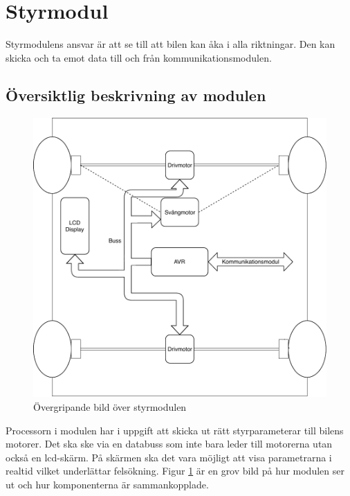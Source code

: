 \documentclass[systemskiss/skiss.tex]{subfiles}
\begin{document}
\section{Styrmodul}
Styrmodulens ansvar är att se till att bilen kan åka i alla riktningar. Den kan skicka och ta emot data till och från kommunikationsmodulen. 
\subsection{Översiktlig beskrivning av modulen}
\begin{figure}[h]
    \centering
    \includegraphics[width=0.6\linewidth]{systemskiss/figures/styrmodul.pdf}
    \caption{Övergripande bild över styrmodulen}
    \label{fig:styrskiss}
\end{figure}
\noindent
Processorn i modulen har i uppgift att skicka ut rätt styrparameterar till
bilens motorer. Det ska ske via en databuss som inte bara leder till motorerna
utan också en lcd-skärm. På skärmen ska det vara möjligt att visa parametrarna i realtid vilket underlättar felsökning. Figur \ref{fig:styrskiss} är en grov bild på hur modulen ser ut och hur komponenterna är sammankopplade.
\end{document}
